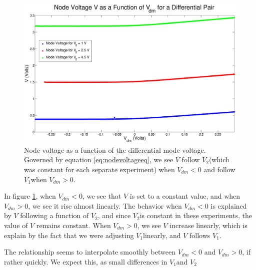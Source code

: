 \documentclass{article}
\newcommand{\Vtwo}{{$V_{2}$}}
\newcommand{\Vone}{{$V_{1}$}}
\begin{document}
\begin{figure}[H]
\centering
\includegraphics[width=\linewidth]{./Figures/NodeVoltageWeakInversion.eps}
\caption{Node voltage as a function of the differential mode voltage. Governed by equation \ref{eq:nodevoltageeq}, we see $V$ follow \Vtwo (which was constant for each separate experiment) when $V_{dm} < 0$ and follow \Vone when $V_{dm} > 0$.}
\label{fig:nodevoltageWI}
\end{figure}

In figure \ref{fig:nodevoltageWI}, when $V_{dm} < 0$, we see that $V$ is set to a constant value, and when $V_{dm} > 0$, we see it rise almost linearly. The behavior when $V_{dm} < 0$ is explained by $V$ following a function of \Vtwo, and since \Vtwo is constant in these experiments, the value of $V$ remains constant. When $V_{dm} > 0$, we see $V$ increase linearly, which is explain by the fact that we were adjusting \Vone linearly, and $V$ follows \Vone.

The relationship seems to interpolate smoothly between $V_{dm} < 0$ and $V_{dm} > 0$, if rather quickly. We expect this, as small differences in \Vone and \Vtwo

\end{document}
